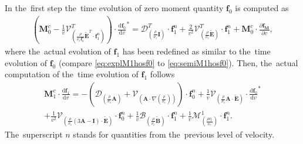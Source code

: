 \documentclass[review]{elsarticle}
\newcommand{\pdv}[2]{\frac{\partial{#1}}{\partial{#2}}}
\newcommand{\vect}[1]{\boldsymbol{#1}}
\newcommand{\matr}[1]{\mathbf{#1}}
\newcommand{\dI}{\text{d}}
\newcommand{\odv}[2]{\frac{\dI #1}{\dI #2}}
\newcommand{\ddv}[2]{\odv{#1}{#2}}
\newcommand{\nue}{\nu_{e}}
\newcommand{\nutot}{\nu_{t}}
\newcommand{\vmag}{v}
\newcommand{\tE}{\vect{\tilde{E}}}
\newcommand{\tB}{\vect{\tilde{B}}}
\newcommand{\fM}{f_M}
\newcommand{\vfzero}{\vect{f}_0}
\newcommand{\fone}{\vect{f}_1}
\newcommand{\MI}{\matr{I}}
\newcommand{\MA}{\matr{A}}
\newcommand{\IM}{\boldsymbol{\mathcal{M}}}
\newcommand{\ID}{\boldsymbol{\mathcal{D}}}
\newcommand{\IV}{\boldsymbol{\mathcal{V}}}
\newcommand{\IB}{\boldsymbol{\mathcal{B}}}
\begin{document}
In the~first step the~time evolution of zero moment quantity $\vfzero$ is 
computed as
\begin{multline}
  \left( \matr{M}^c_0 
  - \frac{1}{\vmag}
  \IV^T_{\left(\frac{\rho}{\nue\vfzero^n}\tE^T\cdot\fone^n\right)}
  \right) \cdot {\ddv{\vfzero}{\vmag}}^* 
  = 
  \ID^T_{\left(\frac{\rho}{\nue}\MI\right)} \cdot \fone^n 
  + \frac{2}{\vmag^2}\IV^T_{\left(\frac{\rho}{\nue}\tE\right)} \cdot \fone^n
  + \matr{M}^c_0 \cdot \pdv{\vect{\fM}}{\vmag} ,  
  \label{eq:explM1hosf0}
\end{multline}
where the~actual evolution of $\fone$ has been redefined as similar to 
the~time evolution of $\vfzero$ (compare \eqref{eq:explM1hosf0} to 
\eqref{eq:semiM1hosf0}). Then, the~actual computation of the~time evolution 
of $\fone$ follows
\begin{multline}
  \matr{M}^c_1 \cdot \ddv{\fone}{\vmag} 
  = 
  - \left(\ID_{\left(\frac{\rho}{\nue}\MA\right)}  
  + \IV_{\left( \MA \cdot \nabla\left(\frac{\rho}{\nue}\right) \right)} \right) 
  \cdot \vfzero^n  
  + \frac{1}{\vmag}\IV_{\left(\frac{\rho}{\nue}\MA \cdot \tE\right)} \cdot
  {\ddv{\vfzero}{\vmag}}^* \\
  + \frac{1}{\vmag^2}\IV_{\left(\frac{\rho}{\nue} 
  \left( 3\MA - \MI \right) \cdot \tE \right)} \cdot \vfzero^n
  + \frac{1}{\vmag}\IB_{\left( \frac{\rho}{\nue}\tB \right)} \cdot \fone^n
  + \frac{1}{\vmag}\IM^1_{\left( \frac{\rho \nutot}{\nue} \right)} 
  \cdot \fone^n .
  \label{eq:explM1hosf1}
\end{multline}
The~superscript $n$ stands for quantities from the~previous level of velocity.
\end{document}

